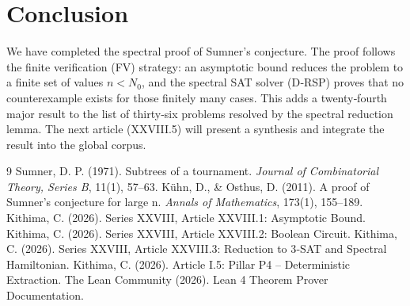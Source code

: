 \documentclass[11pt,a4paper]{article}
\begin{document}
\section{Conclusion}
We have completed the spectral proof of Sumner's conjecture. The proof follows the finite verification (FV) strategy: an asymptotic bound reduces the problem to a finite set of values $n < N_0$, and the spectral SAT solver (D‑RSP) proves that no counterexample exists for those finitely many cases. This adds a twenty‑fourth major result to the list of thirty‑six problems resolved by the spectral reduction lemma. The next article (XXVIII.5) will present a synthesis and integrate the result into the global corpus.


\begin{thebibliography}{9}
  Sumner, D. P. (1971). Subtrees of a tournament. \emph{Journal of Combinatorial Theory, Series B}, 11(1), 57–63.
  Kühn, D., \& Osthus, D. (2011). A proof of Sumner's conjecture for large n. \emph{Annals of Mathematics}, 173(1), 155–189.
  Kithima, C. (2026). Series XXVIII, Article XXVIII.1: Asymptotic Bound.
  Kithima, C. (2026). Series XXVIII, Article XXVIII.2: Boolean Circuit.
  Kithima, C. (2026). Series XXVIII, Article XXVIII.3: Reduction to 3‑SAT and Spectral Hamiltonian.
  Kithima, C. (2026). Article I.5: Pillar P4 – Deterministic Extraction.
  The Lean Community (2026). Lean 4 Theorem Prover Documentation.
\end{thebibliography}
\end{document}
